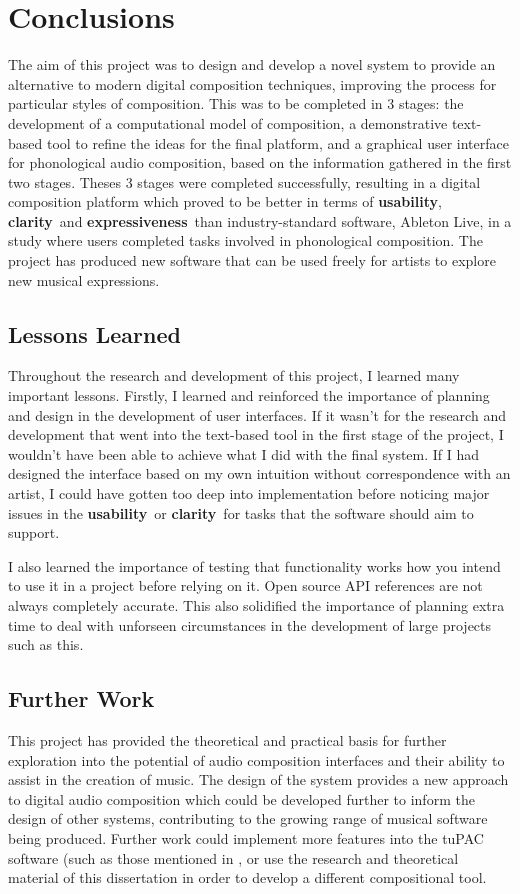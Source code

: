 \documentclass[12pt,a4paper,oneside,openright]{report}
\newcommand{\usability}{\textbf{usability}}
\newcommand{\clarity}{\textbf{clarity}}
\newcommand{\expressiveness}{\textbf{expressiveness}}
\begin{document}
\chapter{Conclusions}
The aim of this project was to design and develop a novel system to provide an alternative to modern digital composition techniques, improving the process for particular styles of composition. This was to be completed in 3 stages: the development of a computational model of composition, a demonstrative text-based tool to refine the ideas for the final platform, and a graphical user interface for phonological audio composition, based on the information gathered in the first two stages. Theses 3 stages were completed successfully, resulting in a digital composition platform which proved to be better in terms of \usability, \clarity\ and \expressiveness\ than industry-standard software, Ableton Live, in a study where users completed tasks involved in phonological composition. The project has produced new software that can be used freely for artists to explore new musical expressions.

\section{Lessons Learned}
Throughout the research and development of this project, I learned many important lessons. Firstly, I learned and reinforced the importance of planning and design in the development of user interfaces. If it wasn't for the research and development that went into the text-based tool in the first stage of the project, I wouldn't have been able to achieve what I did with the final system. If I had designed the interface based on my own intuition without correspondence with an artist, I could have gotten too deep into implementation before noticing major issues in the \usability\ or \clarity\ for tasks that the software should aim to support. 

I also learned the importance of testing that functionality works how you intend to use it in a project before relying on it. Open source API references are not always completely accurate. This also solidified the importance of planning extra time to deal with unforseen circumstances in the development of large projects such as this.

\section{Further Work}
This project has provided the theoretical and practical basis for further exploration into the potential of audio composition interfaces and their ability to assist in the creation of music. The design of the system provides a new approach to digital audio composition which could be developed further to inform the design of other systems, contributing to the growing range of musical software being produced. Further work could implement more features into the tuPAC software (such as those mentioned in , or use the research and theoretical material of this dissertation in order to develop a different compositional tool.
\end{document}
